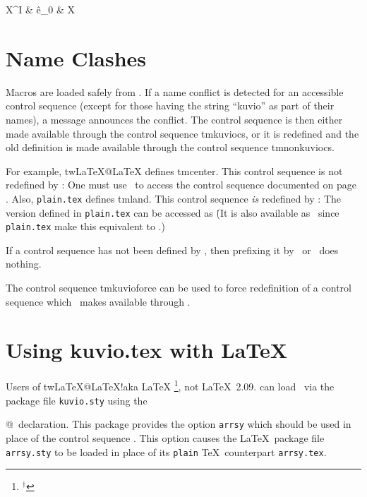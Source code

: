 \eg
\def\ReallySimpleRightwardArrow#1#2#3{%
   \Dg #1 & \rTo \^{#2} & #3 \\ \endDg}

\ReallySimpleRightwardArrow{X^I}{e_0}X
\endeg

\section{Name Clashes}

Macros are loaded safely from \kuvio. If a name conflict is detected
for an accessible control sequence (except for those having the string
``kuvio'' as part of their names), a message announces the
conflict. The control sequence is then either made available through
the control sequence \index tm{kuviocs}, or it is redefined and the
old definition is made available through the control sequence \index
tm{nonkuviocs}.

For example, \index tw{LaTeX@\LaTeX} defines \index tm{center}. This
control sequence is not redefined by \kuvio: One must use
\@\kuviocs\center@\ to access the control sequence documented on page
\pageref{center def}. Also, {\tt plain.tex} defines \index
tm{land}. This control sequence {\sl is\/} redefined by
\kuvio: The version defined in {\tt plain.tex} can be accessed as
\@\nonkuviocs\land@\. (It is also available as
\csq\wedge\ since {\tt plain.tex} make this equivalent to \csq\land.)

If a control sequence has not been defined by \kuvio, then prefixing
it by \csq\kuviocs\ or \csq\nonkuviocs\ does nothing.

The control sequence \index tm{kuvioforce} can be used to force
redefinition of a control sequence which \kuvio\ makes available
through \csq\kuviocs.

\section{Using kuvio.tex with \LaTeX}
\label{Using kuvio with LaTeX}

Users of \sindex tw{LaTeX@\LaTeX!aka \LaTeXe}\LaTeX
\footnote{$^\dagger$}{\LaTeXe, not \LaTeX\ 2.09.}
can load \kuvio\ via the package file {\tt kuvio.sty} using the
\@\usepackage{kuvio}@\ declaration. This package provides the option
{\tt arrsy} which should be used in place of the control sequence
\csq\arrsy.  This option causes the \LaTeX\ package file {\tt
arrsy.sty} to be loaded in place of its {\tt plain} \TeX\ counterpart
{\tt arrsy.tex}.

